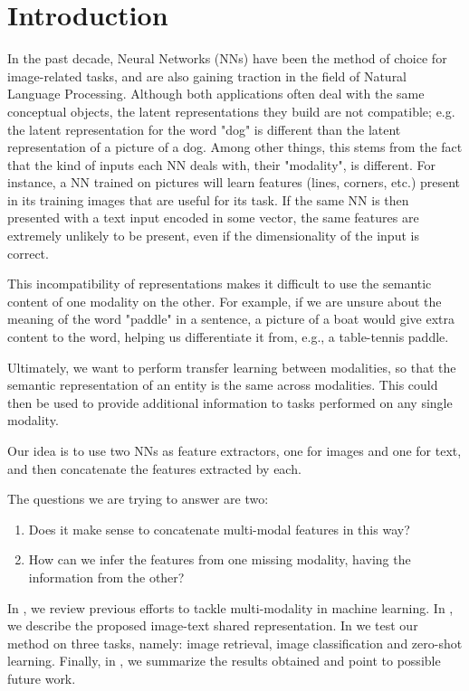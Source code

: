 \documentclass[a4paper]{standalone}
\begin{document}
\chapter{Introduction}
In the past decade, Neural Networks (NNs) have been the method of choice for image-related tasks, and are also gaining traction in the field of Natural Language Processing. Although both applications often deal with the same conceptual objects, the latent representations they build are not compatible; e.g. the latent representation for the word "dog" is different than the latent representation of a picture of a dog. Among other things, this stems from the fact that the kind of inputs each NN deals with, their "modality", is different. For instance, a NN trained on pictures will learn features (lines, corners, etc.) present in its training images that are useful for its task. If the same NN is then presented with a text input encoded in some vector, the same features are extremely unlikely to be present, even if the dimensionality of the input is correct.

This incompatibility of representations makes it difficult to use the semantic content of one modality on the other. For example, if we are unsure about the meaning of the word "paddle" in a sentence, a picture of a boat would give extra content to the word, helping us differentiate it from, e.g., a table-tennis paddle.

Ultimately, we want to perform transfer learning between modalities, so that the semantic representation of an entity is the same across modalities. This could then be used to provide additional information to tasks performed on any single modality.

Our idea is to use two NNs as feature extractors, one for images and one for text, and then concatenate the features extracted by each.

The questions we are trying to answer are two:

\begin{enumerate}
    \item Does it make sense to concatenate multi-modal features in this way?
    \item How can we infer the features from one missing modality, having the information from the other?
\end{enumerate}

In , we review previous efforts to tackle multi-modality in machine learning. In , we describe the proposed image-text shared representation. In  we test our method on three tasks, namely: image retrieval, image classification and zero-shot learning. Finally, in , we summarize the results obtained and point to possible future work.
\end{document}
